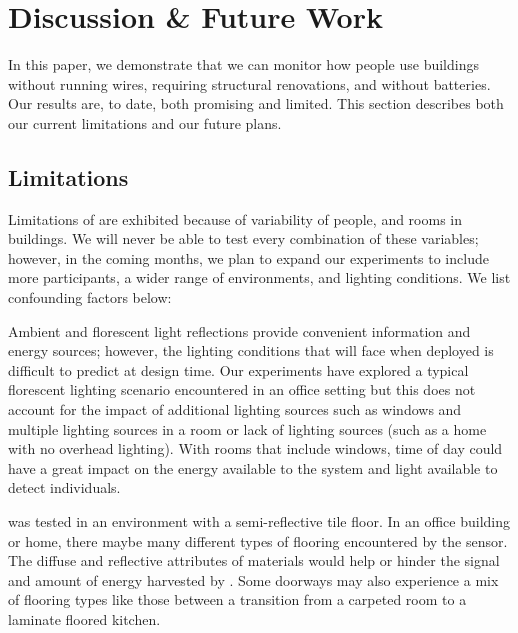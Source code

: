\section{Discussion \& Future Work}
\label{sec:discussion}

In this paper, we demonstrate that we can monitor how people use buildings without running wires, requiring structural renovations, and without batteries.
Our results are, to date, both promising and limited.
This section describes both our current limitations and our future plans.

\subsection{Limitations}
Limitations of \sysname are exhibited because of variability of people, and rooms in buildings. 
We will never be able to test every combination of these variables; however, in the coming months, we plan to expand our experiments to include more participants, a wider range of environments, and lighting conditions. We list confounding factors below:

 Ambient and florescent light reflections provide convenient information and energy sources; however, the lighting conditions that \sysname will face when deployed is difficult to predict at design time.
Our experiments have explored a typical florescent lighting scenario encountered in an office setting but this does not account for the impact of additional lighting sources such as windows and multiple lighting sources in a room or lack of lighting sources (such as a home with no overhead lighting).  
With rooms that include windows, time of day could have a great impact on the energy available to the system and light available to detect individuals.  

 \sysname was tested in an environment with a semi-reflective tile floor.  
In an office building or home, there maybe many different types of flooring encountered by the sensor.  
The diffuse and reflective attributes of materials would help or hinder the signal and amount of energy harvested by \sysname.
Some doorways may also experience a mix of flooring types like those  between a transition from a carpeted room to a laminate floored kitchen.

